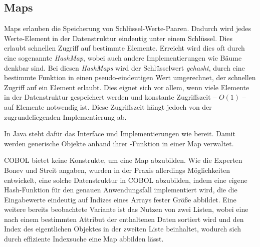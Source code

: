 \subsection{Maps}
Maps erlauben die Speicherung von Schlüssel-Werte-Paaren. Dadurch wird jedes Werte-Element in der Datenstruktur eindeutig unter einem Schlüssel. Dies erlaubt schnellen Zugriff auf bestimmte Elemente. Erreicht wird dies oft durch eine sogenannte \textit{HashMap}, wobei auch andere Implementierungen wie Bäume denkbar sind. Bei diesen \textit{HashMaps} wird der Schlüsselwert \textit{gehasht}, \dahe durch eine bestimmte Funktion in einen pseudo-eindeutigen Wert umgerechnet, der schnellen Zugriff auf ein Element erlaubt. Dies eignet sich vor allem, wenn viele Elemente in der Datenstruktur gespeichert werden und konstante Zugriffszeit -- $O(1)$ -- auf Elemente notwendig ist. Diese Zugriffszeit hängt jedoch von der zugrundeliegenden Implementierung ab.


In Java steht dafür das Interface  und Implementierungen wie  bereit. Damit werden generische Objekte anhand ihrer -Funktion in einer Map verwaltet. 

COBOL bietet keine Konstrukte, um eine Map abzubilden. Wie die Experten Bonev und Streit angaben, wurden in der Praxis allerdings Möglichkeiten entwickelt, eine solche Datenstruktur in COBOL abzubilden, indem \zB eine eigene Hash-Funktion für den genauen Anwendungsfall implementiert wird, die die Eingabewerte eindeutig auf Indizes eines Arrays fester Größe abbildet. Eine weitere bereits beobachtete Variante ist das Nutzen von zwei Listen, wobei eine nach einem bestimmten Attribut der enthaltenen Daten sortiert wird und den Index des eigentlichen Objektes in der zweiten Liste beinhaltet, wodurch sich durch effiziente Indexsuche eine Map abbilden lässt.